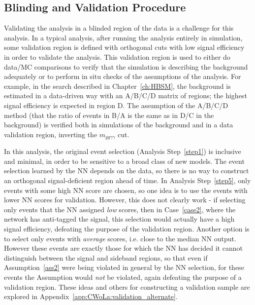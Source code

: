 \FloatBarrier
\subsection{Blinding and Validation Procedure}
\label{sec:CWoLa:blinding}
Validating the analysis in a blinded region of the data is a challenge for this analysis.
In a typical analysis, after running the analysis entirely in simulation, some validation region is defined with orthogonal cuts with low signal efficiency in order to validate the analysis.
This validation region is used to either do data/MC comparisons to verify that the simulation is describing the background adequately or to perform in situ checks of the assumptions of the analysis.
For example, in the search described in Chapter~\ref{ch:HBSM}, the background is estimated in a data-driven way with an A/B/C/D matrix of regions; the highest signal efficiency is expected in region D.
The assumption of the A/B/C/D method (that the ratio of events in B/A is the same as in D/C in the background) is verified both in simulations of the background and in a data validation region, inverting the $m_{gg\gamma\gamma}$ cut.

In this analysis, the original event selection (Analysis Step~\ref{step1}) is inclusive and minimal, in order to be sensitive to a broad class of new models.
The event selection learned by the NN depends on the data, so there is no way to construct an orthogonal signal-deficient region ahead of time.
In Analysis Step~\ref{step5}, only events with some high NN score are chosen, so one idea is to use the events with lower NN scores for validation.
However, this does not clearly work - if selecting only events that the NN assigned \textit{low} scores, then in Case~\ref{case2}, where the network has anti-tagged the signal, this selection would actually have a high signal efficiency, defeating the purpose of the validation region.
Another option is to select only events with \textit{average} scores, i.e. close to the median NN output.
However these events are exactly those for which the NN has decided it cannot distinguish between the signal and sideband regions, so that even if Assumption~\ref{ass2} were being violated in general by the NN selection, for these events the Assumption would \textit{not} be violated, again defeating the purpose of a validation region.
These ideas and others for constructing a validation sample are explored in Appendix~\ref{app:CWoLa:validation_alternate}.

